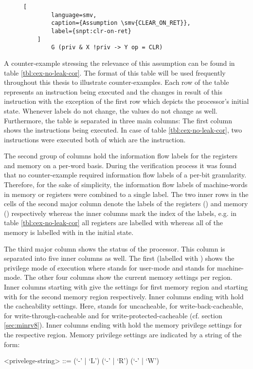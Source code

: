\begin{figure}
    \begin{lstlisting}[
        language=smv,
        caption={Assumption \smv{CLEAR_ON_RET}},
        label={snpt:clr-on-ret}
    ]
        G (priv & X !priv -> Y op = CLR)
    \end{lstlisting}
\end{figure}

A counter-example stressing the relevance of this assumption can be found in table \ref{tbl:cex-no-leak-cor}.
The format of this table will be used frequently throughout this thesis to illustrate counter-examples.
Each row of the table represents an instruction being executed and the changes in result of this instruction with the exception of the first row which depicts the processor's initial state.
Whenever labels do not change, the values do not change as well.
Furthermore, the table is separated in three main columns: The first column shows the instructions being executed.
In case of table \ref{tbl:cex-no-leak-cor}, two instructions were executed both of which are the  instruction.

The second group of columns hold the information flow labels for the registers and memory on a per-word basis.
During the verification process it was found that no counter-example required information flow labels of a per-bit granularity.
Therefore, for the sake of simplicity, the information flow labels of machine-words in memory or registers were combined to a single label.
The two inner rows in the cells of the second major column denote the labels of the registers () and memory () respectively whereas the inner columns mark the index of the labels, e.g. in table \ref{tbl:cex-no-leak-cor} all registers are labelled with \CT{} whereas all of the memory is labelled with \CU{} in the initial state.

The third major column shows the status of the processor.
This column is separated into five inner columns as well.
The first (labelled with ) shows the privilege mode of execution where  stands for user-mode and  stands for machine-mode.
The other four columns show the current memory settings per region.
Inner columns starting with  give the settings for first memory region and starting with  for the second memory region respectively.
Inner columns ending with  hold the cacheability settings.
Here,  stands for uncacheable,  for write-back-cacheable,  for write-through-cacheable and  for write-protected-cacheable (cf. section \ref{sec:minrv8}).
Inner columns ending with  hold the memory privilege settings for the respective region.
Memory privilege settings are indicated by a string of the form:
\begin{grammar}
    <privelege-string> ::= (`-' | `L') (`-' | `R') (`-' | `W')
\end{grammar}

